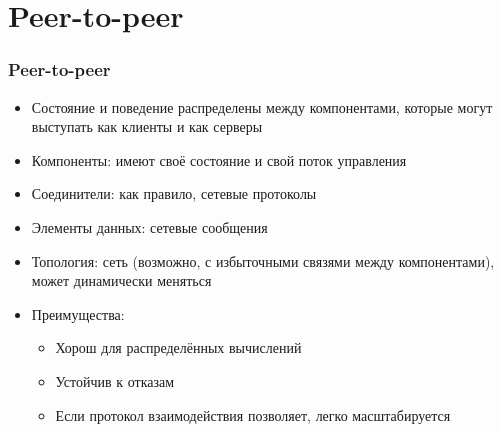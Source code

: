 \documentclass{../../slides-style}
\begin{document}
    \section{Peer-to-peer}

    \begin{frame}
        \frametitle{Peer-to-peer}
        \begin{itemize}
            \item Состояние и поведение распределены между компонентами, которые могут выступать как клиенты и как серверы
            \item Компоненты: имеют своё состояние и свой поток управления
            \item Соединители: как правило, сетевые протоколы
            \item Элементы данных: сетевые сообщения
            \item Топология: сеть (возможно, с избыточными связями между компонентами), может динамически меняться
            \item Преимущества:
            \begin{itemize}
                \item Хорош для распределённых вычислений
                \item Устойчив к отказам
                \item Если протокол взаимодействия позволяет, легко масштабируется
            \end{itemize}
        \end{itemize}
    \end{frame}
\end{document}
